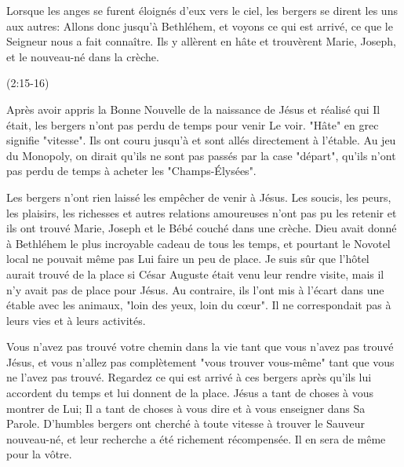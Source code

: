 
\epigraph{%
Lorsque les anges se furent éloignés d’eux vers le ciel, les bergers se dirent les uns aux autres: Allons donc jusqu’à Bethléhem, et voyons ce qui est arrivé, ce que le Seigneur nous a fait connaître. Ils y allèrent en hâte et trouvèrent Marie, Joseph, et le nouveau-né dans la crèche.}{(2:15-16)}

Après avoir appris la Bonne Nouvelle de la naissance de Jésus et réalisé qui Il était, les bergers n'ont pas perdu de temps pour venir Le voir. "Hâte" en grec signifie "vitesse". Ils ont couru jusqu'à et sont allés directement à l'étable. Au jeu du Monopoly, on dirait qu'ils ne sont pas passés par la case "départ", qu'ils n'ont pas perdu de temps à acheter les "Champs-Élysées".

Les bergers n'ont rien laissé les empêcher de venir à Jésus. Les soucis, les peurs, les plaisirs, les richesses et autres relations amoureuses n'ont pas pu les retenir et ils ont trouvé Marie, Joseph et le Bébé couché dans une crèche. Dieu avait donné à Bethléhem le plus incroyable cadeau de tous les temps, et pourtant le Novotel local ne pouvait même pas Lui faire un peu de place. Je suis sûr que l'hôtel aurait trouvé de la place si César Auguste était venu leur rendre visite, mais il n'y avait pas de place pour Jésus. Au contraire, ils l'ont mis à l'écart dans une étable avec les animaux, "loin des yeux, loin du cœur". Il ne correspondait pas à leurs vies et à leurs activités.

Vous n'avez pas trouvé votre chemin dans la vie tant que vous n'avez pas trouvé Jésus, et vous n'allez pas complètement "vous trouver vous-même" tant que vous ne l'avez pas trouvé. Regardez ce qui est arrivé à ces bergers après qu'ils lui accordent du temps et lui donnent de la place. Jésus a tant de choses à vous montrer de Lui; Il a tant de choses à vous dire et à vous enseigner dans Sa Parole. D'humbles bergers ont cherché à toute vitesse à trouver le Sauveur nouveau-né, et leur recherche a été richement récompensée. Il en sera de même pour la vôtre.




